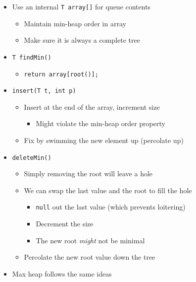 \documentclass[
  10pt,
  english,
  letterpaper,
,tablecaptionabove
]{scrartcl}
\newcommand{\passthrough}[1]{#1}
\providecommand{\tightlist}{%
  \setlength{\itemsep}{0pt}\setlength{\parskip}{0pt}}
\begin{document}
\begin{itemize}
\tightlist
\item
  Use an internal \passthrough{\lstinline!T array[]!} for queue contents

  \begin{itemize}
  \tightlist
  \item
    Maintain min-heap order in array
  \item
    Make sure it is always a complete tree
  \end{itemize}
\item
  \passthrough{\lstinline!T findMin()!}

  \begin{itemize}
  \tightlist
  \item
    \passthrough{\lstinline!return array[root()];!}
  \end{itemize}
\item
  \passthrough{\lstinline!insert(T t, int p)!}

  \begin{itemize}
  \tightlist
  \item
    Insert at the end of the array, increment size

    \begin{itemize}
    \tightlist
    \item
      Might violate the min-heap order property
    \end{itemize}
  \item
    Fix by swimming the new element up (percolate up)
  \end{itemize}
\item
  \passthrough{\lstinline!deleteMin()!}

  \begin{itemize}
  \tightlist
  \item
    Simply removing the root will leave a hole
  \item
    We can swap the last value and the root to fill the hole

    \begin{itemize}
    \tightlist
    \item
      \passthrough{\lstinline!null!} out the last value (which prevents
      loitering)
    \item
      Decrement the size
    \item
      The new root \emph{might} not be minimal
    \end{itemize}
  \item
    Percolate the new root value down the tree
  \end{itemize}
\item
  Max heap follows the same ideas
\end{itemize}
\end{document}
